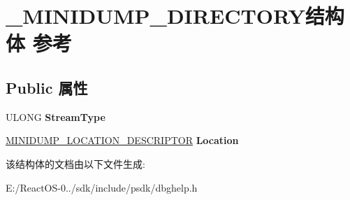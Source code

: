 \hypertarget{struct___m_i_n_i_d_u_m_p___d_i_r_e_c_t_o_r_y}{}\section{\+\_\+\+M\+I\+N\+I\+D\+U\+M\+P\+\_\+\+D\+I\+R\+E\+C\+T\+O\+R\+Y结构体 参考}
\label{struct___m_i_n_i_d_u_m_p___d_i_r_e_c_t_o_r_y}
\subsection*{Public 属性}
\begin{DoxyCompactItemize}
\item 
\mbox{\label{struct___m_i_n_i_d_u_m_p___d_i_r_e_c_t_o_r_y_a9b2045371e1735afb293751350a98d01}} 
U\+L\+O\+NG {\bfseries Stream\+Type}
\item 
\mbox{\label{struct___m_i_n_i_d_u_m_p___d_i_r_e_c_t_o_r_y_ac464e1e3d9ac72893f4353656b7a1a2f}} 
\hyperlink{struct___m_i_n_i_d_u_m_p___l_o_c_a_t_i_o_n___d_e_s_c_r_i_p_t_o_r}{M\+I\+N\+I\+D\+U\+M\+P\+\_\+\+L\+O\+C\+A\+T\+I\+O\+N\+\_\+\+D\+E\+S\+C\+R\+I\+P\+T\+OR} {\bfseries Location}
\end{DoxyCompactItemize}


该结构体的文档由以下文件生成\+:\begin{DoxyCompactItemize}
\item 
E\+:/\+React\+O\+S-\/0../sdk/include/psdk/dbghelp.\+h\end{DoxyCompactItemize}
